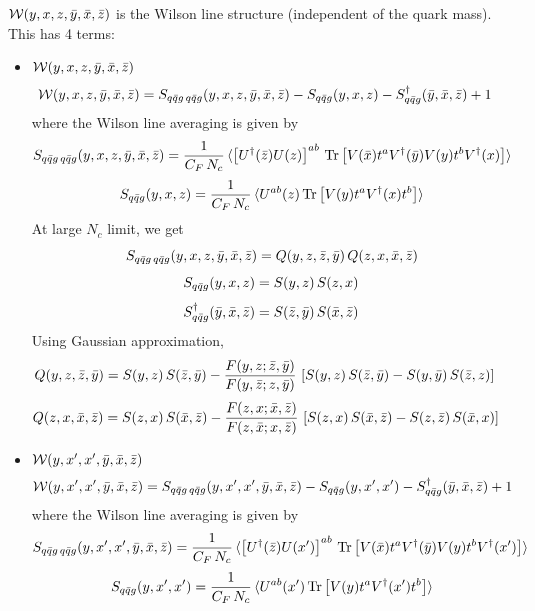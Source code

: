 \documentclass[9pt]{article}
\numberwithin{equation}{section}
\begin{document}
$\mathcal{W}(y,x,z,\Bar{y},\Bar{x},\Bar{z})$ is the Wilson line structure (independent of the quark mass). This has 4 terms:

\begin{itemize}
    \item $\mathcal{W}(y,x,z,\Bar{y},\Bar{x},\Bar{z})$
    \begin{align}
        \mathcal{W}(y,x,z,\Bar{y},\Bar{x},\Bar{z}) & = S_{q\Bar{q}g\,q\Bar{q}g}(y,x,z,\Bar{y},\Bar{x},\Bar{z}) -S_{q\Bar{q}g}(y,x,z) - S^{\dagger}_{q\Bar{q}g}(\Bar{y},\Bar{x},\Bar{z}) + 1
    \end{align}
where the Wilson line averaging is given by 
$$S_{q\Bar{q}g\,q\Bar{q}g}(y,x,z,\Bar{y},\Bar{x},\Bar{z}) = \frac{1}{C_{F}\,N_{c}}\, \langle \left[U^{\dagger}(\Bar{z})U(z)\right]^{ab}\, \text{Tr}\left[V(\Bar{x})t^{a}V^{\dagger}(\Bar{y})V(y)t^{b}V^{\dagger}(x)\right] \rangle$$
$$S_{q\Bar{q}g}(y,x,z) =  \frac{1}{C_{F}\,N_{c}}\, \langle U^{ab}(z)\,\text{Tr}\left[V(y)t^{a}V^{\dagger}(x)t^{b}\right]\rangle$$
At large $N_{c}$ limit, we get
$$S_{q\Bar{q}g\,q\Bar{q}g}(y,x,z,\Bar{y},\Bar{x},\Bar{z}) = Q(y,z,\Bar{z},\Bar{y})\, Q(z,x,\Bar{x},\Bar{z})$$
$$S_{q\Bar{q}g}(y,x,z) = S(y,z)\, S(z,x)$$
$$S^{\dagger}_{q\Bar{q}g}(\Bar{y},\Bar{x},\Bar{z}) = S(\Bar{z},\Bar{y})\, S(\Bar{x},\Bar{z})$$
Using Gaussian approximation,
\begin{align}
    Q(y,z,\Bar{z},\Bar{y}) & = S(y,z)\,S(\Bar{z},\Bar{y}) - \frac{F(y,z;\Bar{z},\Bar{y})}{F(y,\Bar{z};z,\Bar{y})}\, \left[S(y,z)\,S(\Bar{z},\Bar{y})-S(y,\Bar{y})\, S(\Bar{z},z)\right]
\end{align}
\begin{align}
    Q(z,x,\Bar{x},\Bar{z}) & = S(z,x)\,S(\Bar{x},\Bar{z}) - \frac{F(z,x;\Bar{x},\Bar{z})}{F(z,\Bar{x};x,\Bar{z})}\, \left[S(z,x)\,S(\Bar{x},\Bar{z})-S(z,\Bar{z})\, S(\Bar{x},x)\right]
\end{align}
\item $\mathcal{W}(y,x',x',\Bar{y},\Bar{x},\Bar{z})$
\begin{align}
        \mathcal{W}(y,x',x',\Bar{y},\Bar{x},\Bar{z}) & = S_{q\Bar{q}g\,q\Bar{q}g}(y,x',x',\Bar{y},\Bar{x},\Bar{z}) -S_{q\Bar{q}g}(y,x',x') - S^{\dagger}_{q\Bar{q}g}(\Bar{y},\Bar{x},\Bar{z}) + 1
    \end{align}
where the Wilson line averaging is given by 
$$S_{q\Bar{q}g\,q\Bar{q}g}(y,x',x',\Bar{y},\Bar{x},\Bar{z}) =  \frac{1}{C_{F}\,N_{c}}\, \langle \left[U^{\dagger}(\Bar{z})U(x')\right]^{ab}\, \text{Tr}\left[V(\Bar{x})t^{a}V^{\dagger}(\Bar{y})V(y)t^{b}V^{\dagger}(x')\right] \rangle$$
$$S_{q\Bar{q}g}(y,x',x') =  \frac{1}{C_{F}\,N_{c}}\, \langle U^{ab}(x')\,\text{Tr}\left[V(y)t^{a}V^{\dagger}(x')t^{b}\right]\rangle$$

\end{itemize}
\end{document}
